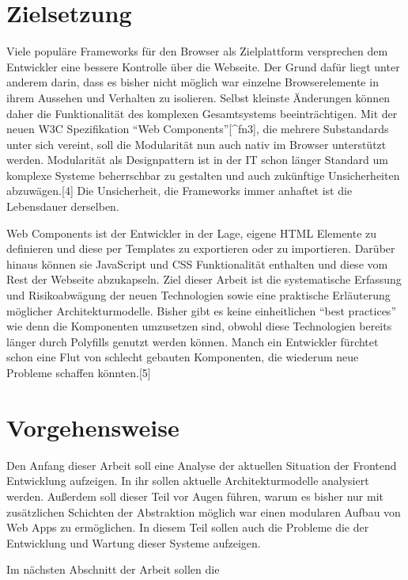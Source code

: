 \section{Zielsetzung}\label{zielsetzung}

Viele populäre Frameworks für den Browser als Zielplattform versprechen
dem Entwickler eine bessere Kontrolle über die Webseite. Der Grund dafür
liegt unter anderem darin, dass es bisher nicht möglich war einzelne
Browserelemente in ihrem Aussehen und Verhalten zu isolieren. Selbst
kleinste Änderungen können daher die Funktionalität des komplexen
Gesamtsystems beeinträchtigen. Mit der neuen W3C Spezifikation ``Web
Components''{[}\^{}fn3{]}, die mehrere Substandards unter sich vereint,
soll die Modularität nun auch nativ im Browser unterstützt werden.
Modularität als Designpattern ist in der IT schon länger Standard um
komplexe Systeme beherrschbar zu gestalten und auch zukünftige
Unsicherheiten abzuwägen.{[}4{]} Die Unsicherheit, die Frameworks immer
anhaftet ist die Lebensdauer derselben.

Web Components ist der Entwickler in der Lage, eigene HTML Elemente zu
definieren und diese per Templates zu exportieren oder zu importieren.
Darüber hinaus können sie JavaScript und CSS Funktionalität enthalten
und diese vom Rest der Webseite abzukapseln. Ziel dieser Arbeit ist die
systematische Erfassung und Risikoabwägung der neuen Technologien sowie
eine praktische Erläuterung möglicher Architekturmodelle. Bisher gibt es
keine einheitlichen ``best practices'' wie denn die Komponenten
umzusetzen sind, obwohl diese Technologien bereits länger durch
Polyfills genutzt werden können. Manch ein Entwickler fürchtet schon
eine Flut von schlecht gebauten Komponenten, die wiederum neue Probleme
schaffen könnten.{[}5{]}

\section{Vorgehensweise}\label{vorgehensweise}

Den Anfang dieser Arbeit soll eine Analyse der aktuellen Situation der
Frontend Entwicklung aufzeigen. In ihr sollen aktuelle
Architekturmodelle analysiert werden. Außerdem soll dieser Teil vor
Augen führen, warum es bisher nur mit zusätzlichen Schichten der
Abstraktion möglich war einen modularen Aufbau von Web Apps zu
ermöglichen. In diesem Teil sollen auch die Probleme die der Entwicklung
und Wartung dieser Systeme aufzeigen.

Im nächsten Abschnitt der Arbeit sollen die

